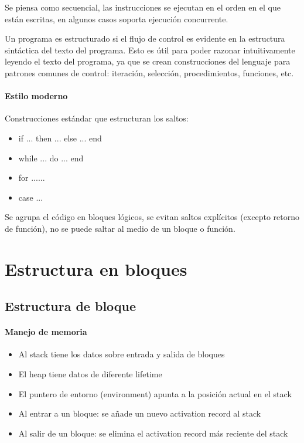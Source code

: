 \documentclass[10pt,a4paper]{report}
\begin{document}
\par Se piensa como secuencial, las instrucciones se ejecutan en el orden en el que están escritas, en algunos casos soporta ejecución concurrente. \par Un programa es estructurado si el flujo de control es evidente en la estructura sintáctica del texto del programa. Esto es 	útil para poder razonar intuitivamente leyendo el texto del programa, ya que se crean construcciones del lenguaje para patrones comunes de control: iteración, selección, procedimientos, funciones, etc.

		\subsubsection{Estilo moderno}
		\par Construcciones estándar que estructuran los saltos: 
		\begin{itemize}
			\item if ... then ... else ... end 
			\item while ... do ... end
			\item for ...{...}
			\item case ...
		\end{itemize}
		
		\par Se agrupa el código en bloques lógicos, se evitan saltos explícitos 
		(excepto retorno de función), no se puede saltar al medio de un 
		bloque o función.


\chapter{Estructura en bloques}

\section{Estructura de bloque}
\subsubsection{Manejo de memoria}
		\begin{itemize}
			\item Al stack tiene los datos sobre entrada y salida de bloques
			\item El heap tiene datos de diferente lifetime
			\item El puntero de entorno (environment) apunta a la posición 
			actual en el stack
			\item Al entrar a un bloque: se añade un nuevo activation record al 
			stack
			\item Al salir de un bloque: se elimina el activation record más 
			reciente del stack
		\end{itemize}
		
\end{document}

